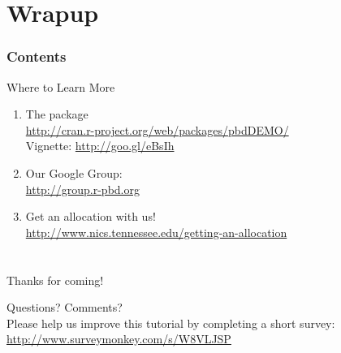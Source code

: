\section{Wrapup}

\hidenum
\begin{frame}[noframenumbering]
\frametitle{Contents}
 \tableofcontents[currentsection,hideothersubsections,sectionstyle=show/hide]
\end{frame}
\shownum

\begin{frame}
  \begin{block}{Where to Learn More}
    \begin{enumerate}
      \item The  package\\
      \url{http://cran.r-project.org/web/packages/pbdDEMO/}\\
      Vignette: \url{http://goo.gl/eBsIh}
      \item Our Google Group:\\
        \url{http://group.r-pbd.org}
      \item Get an allocation with us!\\
        {\small \url{http://www.nics.tennessee.edu/getting-an-allocation}\\ }
    \end{enumerate}
\end{block}
\end{frame}


\section*{}


%   
%   


\hidenum
\begin{frame}[noframenumbering]
 \begin{block}{Thanks for coming!}
 \begin{center}
     {\Large Questions?  Comments?}\\[.4cm]
     Please help us improve this tutorial by completing a short survey:\\
     \url{http://www.surveymonkey.com/s/W8VLJSP}
  \end{center}
 \end{block}
\end{frame}
